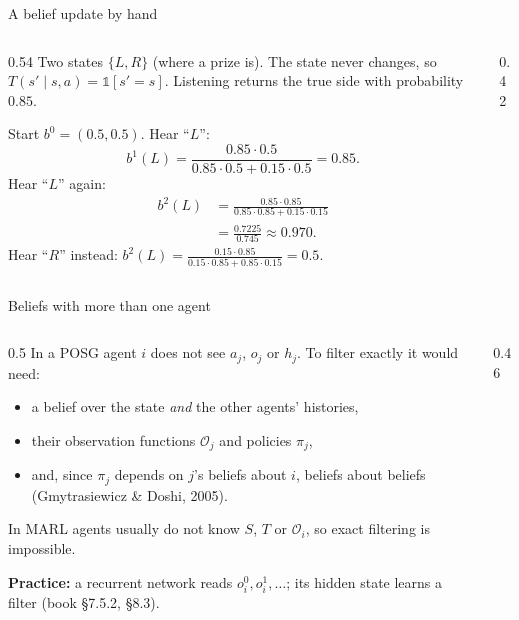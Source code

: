 \documentclass[aspectratio=169,11pt]{beamer}
\begin{document}
\begin{frame}{A belief update by hand}
  \begin{columns}[c]
    \begin{column}{0.54\textwidth}
      Two states $\{L, R\}$ (where a prize is). The state never changes, so $T(s' \mid s, a) = \mathbb{1}[s' = s]$. Listening returns the true side with probability $0.85$.

      Start $b^0 = (0.5, 0.5)$. Hear ``$L$'':
      \[
        b^1(L) = \frac{0.85 \cdot 0.5}{0.85 \cdot 0.5 + 0.15 \cdot 0.5} = 0.85 .
      \]
      Hear ``$L$'' again:
      \begin{align*}
        b^2(L) &= \frac{0.85 \cdot 0.85}{0.85 \cdot 0.85 + 0.15 \cdot 0.15}\\
               &= \frac{0.7225}{0.745} \approx 0.970 .
      \end{align*}
      Hear ``$R$'' instead: $b^2(L) = \frac{0.15 \cdot 0.85}{0.15 \cdot 0.85 + 0.85 \cdot 0.15} = 0.5$.
    \end{column}
    \begin{column}{0.42\textwidth}
      \centering
      
    \end{column}
  \end{columns}
\end{frame}

\begin{frame}{Beliefs with more than one agent}
  \begin{columns}[c]
    \begin{column}{0.5\textwidth}
      In a POSG agent $i$ does not see $a_j$, $o_j$ or $h_j$. To filter exactly it would need:
      \begin{itemize}
        \item a belief over the state \emph{and} the other agents' histories,
        \item their observation functions $\mathcal{O}_j$ and policies $\pi_j$,
        \item and, since $\pi_j$ depends on $j$'s beliefs about $i$, beliefs about beliefs (Gmytrasiewicz \& Doshi, 2005).
      \end{itemize}
      \medskip
      In MARL agents usually do not know $S$, $T$ or $\mathcal{O}_i$, so exact filtering is impossible.
      \medskip

      \textbf{Practice:} a recurrent network reads $o_i^0, o_i^1, \dots$; its hidden state learns a filter (book \S7.5.2, \S8.3).
    \end{column}
    \begin{column}{0.46\textwidth}
      \centering
      
    \end{column}
  \end{columns}
\end{frame}
\end{document}
